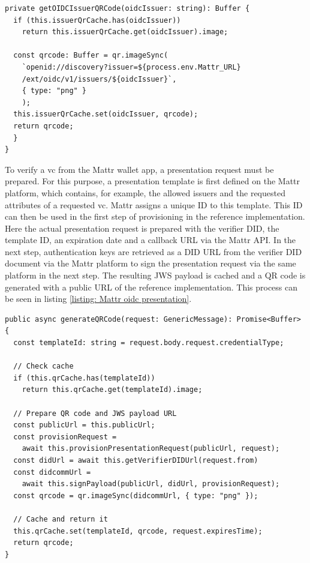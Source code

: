 \begin{lstlisting}[style=ES6, caption=\ac{OIDC} issuance QR code generation, label={listing: Mattr oidc issuance}]
private getOIDCIssuerQRCode(oidcIssuer: string): Buffer {
  if (this.issuerQrCache.has(oidcIssuer)) 
    return this.issuerQrCache.get(oidcIssuer).image;

  const qrcode: Buffer = qr.imageSync(
    `openid://discovery?issuer=${process.env.Mattr_URL}
    /ext/oidc/v1/issuers/${oidcIssuer}`,
    { type: "png" }
    );
  this.issuerQrCache.set(oidcIssuer, qrcode);
  return qrcode;
  }
}\end{lstlisting}

    To verify a \ac{vc} from the Mattr wallet app, a presentation request must be prepared. For this purpose, a presentation template is first defined on the Mattr platform, which contains, for example, the allowed issuers and the requested attributes of a requested \ac{vc}. Mattr assigns a unique ID to this template. This ID can then be used in the first step of provisioning in the reference implementation. Here the actual presentation request is prepared with the verifier \ac{DID}, the template ID, an expiration date and a callback URL via the Mattr API. In the next step, authentication keys are retrieved as a \ac{DID} URL from the verifier \ac{DID} document via the Mattr platform to sign the presentation request via the same platform in the next step. The resulting JWS payload is cached and a QR code is generated with a public URL of the reference implementation. This process can be seen in listing \ref{listing: Mattr oidc presentation}.
    \newline
\begin{lstlisting}[style=ES6, caption=Generate QR code for OIDC presentation reqest, label={listing: Mattr oidc presentation}]
public async generateQRCode(request: GenericMessage): Promise<Buffer> {
  const templateId: string = request.body.request.credentialType;
  
  // Check cache
  if (this.qrCache.has(templateId)) 
    return this.qrCache.get(templateId).image;

  // Prepare QR code and JWS payload URL
  const publicUrl = this.publicUrl;
  const provisionRequest = 
    await this.provisionPresentationRequest(publicUrl, request);
  const didUrl = await this.getVerifierDIDUrl(request.from)
  const didcommUrl = 
    await this.signPayload(publicUrl, didUrl, provisionRequest); 
  const qrcode = qr.imageSync(didcommUrl, { type: "png" });
    
  // Cache and return it
  this.qrCache.set(templateId, qrcode, request.expiresTime);
  return qrcode;
}\end{lstlisting}
    
